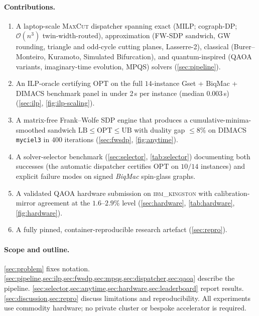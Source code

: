 \documentclass{article}
\theoremstyle{definition}
\theoremstyle{remark}
\newcommand{\MaxCut}{\textsc{MaxCut}\xspace}
\newcommand{\MPQS}{\textsc{MPQS}\xspace}
\newcommand{\QAOA}{\textsc{QAOA}\xspace}
\newcommand{\ILP}{\textsc{ILP}\xspace}
\newcommand{\SDP}{\textsc{SDP}\xspace}
\newcommand{\MILP}{\textsc{MILP}\xspace}
\newcommand{\GW}{\textsc{GW}\xspace}
\newcommand{\OPT}{\mathrm{OPT}}
\newcommand{\LB}{\mathrm{LB}}
\newcommand{\UB}{\mathrm{UB}}
\newcommand{\Oh}{\mathcal{O}}
\begin{document}
\paragraph{Contributions.}
\begin{enumerate}
  \item A laptop-scale \MaxCut dispatcher spanning exact
        (\MILP; cograph-DP; $\Oh(n^3)$ twin-width-routed), approximation
        (FW-\SDP sandwich, \GW rounding, triangle and odd-cycle cutting
        planes, Lasserre-2), classical (Burer--Monteiro, Kuramoto,
        Simulated Bifurcation), and quantum-inspired (\QAOA variants,
        imaginary-time evolution, \MPQS) solvers
        (\cref{sec:pipeline}).
  \item An \ILP-oracle certifying $\OPT$ on the full $14$-instance
        Gset + BiqMac + DIMACS benchmark panel in under 2\,s per instance (median 0.003\,s)
        (\cref{sec:ilp}, \cref{fig:ilp-scaling}).
  \item A matrix-free Frank--Wolfe \SDP engine that produces
        a cumulative-minima-smoothed sandwich $\LB \le \OPT \le \UB$
        with duality gap $\le 8\%$ on DIMACS \texttt{myciel3} in
        $400$ iterations (\cref{sec:fwsdp}, \cref{fig:anytime}).
  \item A solver-selector benchmark (\cref{sec:selector},
        \cref{tab:selector}) documenting both successes (the automatic
        dispatcher certifies $\OPT$ on $10/14$ instances) and explicit
        failure modes on signed \emph{BiqMac} spin-glass graphs.
  \item A validated \QAOA hardware submission on
        \textsc{ibm\_kingston} with calibration-mirror agreement at the
        $1.6$--$2.9\%$ level (\cref{sec:hardware},
        \cref{tab:hardware}, \cref{fig:hardware}).
  \item A fully pinned, container-reproducible research artefact
        (\cref{sec:repro}).
\end{enumerate}

\paragraph{Scope and outline.} \cref{sec:problem} fixes notation.
\cref{sec:pipeline,sec:ilp,sec:fwsdp,sec:mpqs,sec:dispatcher,sec:qaoa}
describe the pipeline. \cref{sec:selector,sec:anytime,sec:hardware,sec:leaderboard}
report results. \cref{sec:discussion,sec:repro} discuss limitations and
reproducibility. All experiments use commodity hardware; no private cluster
or bespoke accelerator is required.
\end{document}
